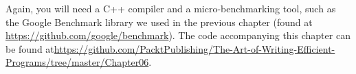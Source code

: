Again, you will need a C++ compiler and a micro-benchmarking tool, such as the Google Benchmark library we used in the previous chapter (found at \url{https://github.com/google/benchmark}). The code accompanying this chapter can be found at\url{https://github.com/PacktPublishing/The-Art-of-Writing-Efficient-Programs/tree/master/Chapter06}.